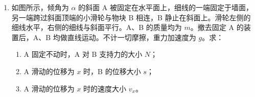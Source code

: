 \documentclass[\gkver]{gaokaozhenti}
\begin{document}
\begin{enumerate}
\begin{enumerate}
	\item
	求 M、N 间感应电动势的大小 $E$；
	\item
	在太阳帆板上将一只“$1.5\UV$、$0.3\UW$”的小灯泡与 M、N 相连构成闭合电路，不计太阳帆板和导线的电阻。试判断小灯泡能否发光，并说明理由；
	\item
	取地球半径 $R=6.4\times10^{3}\Ukm$，地球表面的重力加速度 $g=9.8\Umsq$，试估算“天宫一号”距离地球表面的高度 $h$（计算结果保留一位有效数字）。
\end{enumerate}
\onepicture[align=right, w=6.20cm]{}

\item
如图所示，倾角为 $\alpha$ 的斜面 A 被固定在水平面上，细线的一端固定于墙面，另一端跨过斜面顶端的小滑轮与物块 B 相连，B 静止在斜面上。滑轮左侧的细线水平，右侧的细线与斜面平行。A、B 的质量均为 $m$。撤去固定 A 的装置后，A、B 均做直线运动。不计一切摩擦，重力加速度为 $g$。求：

\begin{enumerate}
	\item
	A 固定不动时，A 对 B 支持力的大小 $N$；
	\item
	A 滑动的位移为 $x$ 时，B 的位移大小 $s$；
	\item
	A 滑动的位移为 $x$ 时的速度大小 $v_{x}$。
\end{enumerate}
\end{enumerate}
\end{document}

